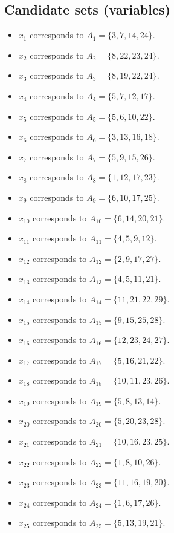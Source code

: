 \documentclass[11pt]{article}
\begin{document}
\subsection*{Candidate sets (variables)}
\begin{itemize}
\item $x_{1}$ corresponds to $A_{1}=\{3, 7, 14, 24\}$.
\item $x_{2}$ corresponds to $A_{2}=\{8, 22, 23, 24\}$.
\item $x_{3}$ corresponds to $A_{3}=\{8, 19, 22, 24\}$.
\item $x_{4}$ corresponds to $A_{4}=\{5, 7, 12, 17\}$.
\item $x_{5}$ corresponds to $A_{5}=\{5, 6, 10, 22\}$.
\item $x_{6}$ corresponds to $A_{6}=\{3, 13, 16, 18\}$.
\item $x_{7}$ corresponds to $A_{7}=\{5, 9, 15, 26\}$.
\item $x_{8}$ corresponds to $A_{8}=\{1, 12, 17, 23\}$.
\item $x_{9}$ corresponds to $A_{9}=\{6, 10, 17, 25\}$.
\item $x_{10}$ corresponds to $A_{10}=\{6, 14, 20, 21\}$.
\item $x_{11}$ corresponds to $A_{11}=\{4, 5, 9, 12\}$.
\item $x_{12}$ corresponds to $A_{12}=\{2, 9, 17, 27\}$.
\item $x_{13}$ corresponds to $A_{13}=\{4, 5, 11, 21\}$.
\item $x_{14}$ corresponds to $A_{14}=\{11, 21, 22, 29\}$.
\item $x_{15}$ corresponds to $A_{15}=\{9, 15, 25, 28\}$.
\item $x_{16}$ corresponds to $A_{16}=\{12, 23, 24, 27\}$.
\item $x_{17}$ corresponds to $A_{17}=\{5, 16, 21, 22\}$.
\item $x_{18}$ corresponds to $A_{18}=\{10, 11, 23, 26\}$.
\item $x_{19}$ corresponds to $A_{19}=\{5, 8, 13, 14\}$.
\item $x_{20}$ corresponds to $A_{20}=\{5, 20, 23, 28\}$.
\item $x_{21}$ corresponds to $A_{21}=\{10, 16, 23, 25\}$.
\item $x_{22}$ corresponds to $A_{22}=\{1, 8, 10, 26\}$.
\item $x_{23}$ corresponds to $A_{23}=\{11, 16, 19, 20\}$.
\item $x_{24}$ corresponds to $A_{24}=\{1, 6, 17, 26\}$.
\item $x_{25}$ corresponds to $A_{25}=\{5, 13, 19, 21\}$.

\end{itemize}
\end{document}
